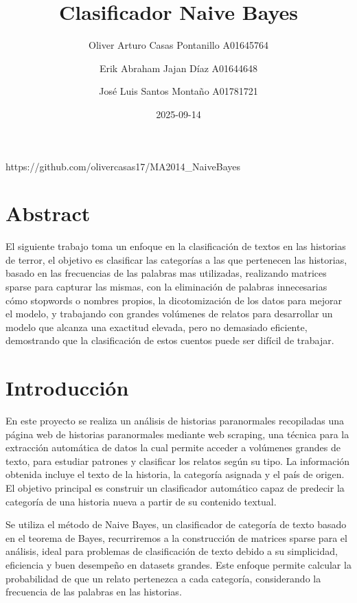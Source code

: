 \documentclass[
  11pt,
  a4paper,
]{article}
\title{Clasificador Naive Bayes}
\author{Oliver Arturo Casas Pontanillo \textbar{} A01645764 \and Erik
Abraham Jajan Díaz \textbar{} A01644648 \and José Luis Santos Montaño
\textbar{} A01781721}
\date{2025-09-14}
\renewcommand*\contentsname{Table of contents}
\newcommand\contentsname{Table of contents}
\begin{document}
\maketitle

\renewcommand*\contentsname{Table of contents}
{
\hypersetup{linkcolor=}
\setcounter{tocdepth}{3}
\tableofcontents
}

https://github.com/olivercasas17/MA2014\_NaiveBayes

\section{Abstract}\label{abstract}

El siguiente trabajo toma un enfoque en la clasificación de textos en
las historias de terror, el objetivo es clasificar las categorías a las
que pertenecen las historias, basado en las frecuencias de las palabras
mas utilizadas, realizando matrices sparse para capturar las mismas, con
la eliminación de palabras innecesarias cómo stopwords o nombres
propios, la dicotomización de los datos para mejorar el modelo, y
trabajando con grandes volúmenes de relatos para desarrollar un modelo
que alcanza una exactitud elevada, pero no demasiado eficiente,
demostrando que la clasificación de estos cuentos puede ser difícil de
trabajar.

\section{Introducción}\label{introducciuxf3n}

En este proyecto se realiza un análisis de historias paranormales
recopiladas una página web de historias paranormales mediante web
scraping, una técnica para la extracción automática de datos la cual
permite acceder a volúmenes grandes de texto, para estudiar patrones y
clasificar los relatos según su tipo. La información obtenida incluye el
texto de la historia, la categoría asignada y el país de origen. El
objetivo principal es construir un clasificador automático capaz de
predecir la categoría de una historia nueva a partir de su contenido
textual.

Se utiliza el método de Naive Bayes, un clasificador de categoría de
texto basado en el teorema de Bayes, recurriremos a la construcción de
matrices sparse para el análisis, ideal para problemas de clasificación
de texto debido a su simplicidad, eficiencia y buen desempeño en
datasets grandes. Este enfoque permite calcular la probabilidad de que
un relato pertenezca a cada categoría, considerando la frecuencia de las
palabras en las historias.
\end{document}
